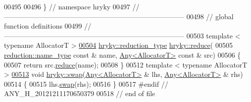 \begin{DoxyCode}
00495 
00496 \} \textcolor{comment}{// namespace hryky}
00497 \textcolor{comment}{//
      ------------------------------------------------------------------------------}
00498 \textcolor{comment}{// global function definitions}
00499 \textcolor{comment}{//
      ------------------------------------------------------------------------------}
00503 \textcolor{comment}{}\textcolor{keyword}{template} < \textcolor{keyword}{typename} AllocatorT >
\hypertarget{any_8h_source_l00504}{}\hyperlink{namespacehryky_a694d24276778b9967b22a08675292f5f}{00504} \hyperlink{classhryky_1_1_intrusive_ptr}{hryky::reduction_type} \hyperlink{namespacehryky_af41cb3af6766761da0ff21b84527a52c}{hryky::reduce}(
00505     \hyperlink{classhryky_1_1reduction_1_1_string}{reduction::name_type} \textcolor{keyword}{const} & name, \hyperlink{classhryky_1_1_any}{Any<AllocatorT>} \textcolor{keyword}{const} & src)
00506 \{
00507     \textcolor{keywordflow}{return} src.\hyperlink{classhryky_1_1_any_a53cbd925fa67505daab6e79749559517}{reduce}(name);
00508 \}
00512 \textcolor{keyword}{template} < \textcolor{keyword}{typename} AllocatorT >
\hypertarget{any_8h_source_l00513}{}\hyperlink{namespacehryky_a68071169aba55a56c4fb370a89c8a387}{00513} \textcolor{keywordtype}{void} \hyperlink{namespacehryky_a4282146df5ea2b68cb667896a2205909}{hryky::swap}(\hyperlink{classhryky_1_1_any}{Any<AllocatorT>} & lhs, \hyperlink{classhryky_1_1_any}{Any<AllocatorT>} & rhs)
00514 \{
00515     lhs.\hyperlink{classhryky_1_1_any_a1603aaa3243f8aaae407c6a5e4287bb6}{swap}(rhs);
00516 \}
00517 \textcolor{preprocessor}{#endif // ANY\_H\_20121211170650379}
00518 \textcolor{preprocessor}{}\textcolor{comment}{// end of file}
\end{DoxyCode}
